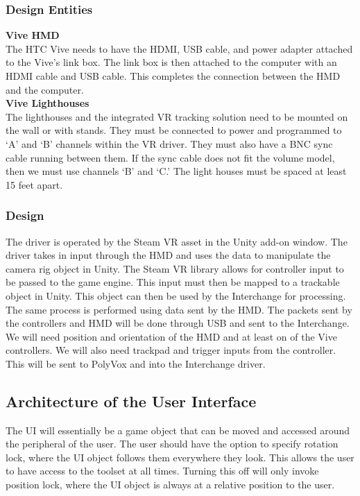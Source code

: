 \documentclass[onecolumn, draftclsnofoot,10pt, compsoc]{IEEEtran}
\begin{document}
\subsubsection{Design Entities}
\textbf{Vive HMD} \\
The HTC Vive needs to have the HDMI, USB cable, and power adapter attached to the Vive's link box. The link box is then attached to the computer with an HDMI cable and USB cable. This completes the connection between the HMD and the computer.\\
\textbf{Vive Lighthouses} \\
The lighthouses and the integrated VR tracking solution need to be mounted on the wall or with stands. They must be connected to power and programmed to ‘A’ and ‘B’ channels within the VR driver. They must also have a BNC sync cable running between them. If the sync cable does not fit the volume model, then we must use channels ‘B’ and ‘C.’ The light houses must be spaced at least 15 feet apart. 
\subsubsection{Design} 
The driver is operated by the Steam VR asset in the Unity add-on window. The driver takes in input through the HMD and uses the data to manipulate the camera rig object in Unity. The Steam VR library allows for controller input to be passed to the game engine. This input must then be mapped to a trackable object in Unity. This object can then be used by the Interchange for processing. The same process is performed using data sent by the HMD. The packets sent by the controllers and HMD will be done through USB and sent to the Interchange. We will need position and orientation of the HMD and at least on of the Vive controllers. We will also need trackpad and trigger inputs from the controller. This will be sent to PolyVox and into the Interchange driver.

\subsection{Architecture of the User Interface}
The UI will essentially be a game object that can be moved and accessed around the peripheral of the user. The user should have the option to specify rotation lock, where the UI object follows them everywhere they look. This allows the user to have access to the toolset at all times. Turning this off will only invoke position lock, where the UI object is always at a relative position to the user. 
\end{document}
